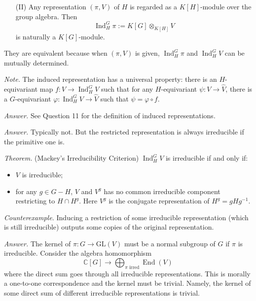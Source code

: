 \documentclass{mathproblems}
\newcommand\C{\mathbb{C}}
\newcommand\GL{\mathrm{GL}}
\DeclareMathOperator{\Ind}{Ind}
\DeclareMathOperator{\End}{End}
\begin{document}
\begin{questions}
\begin{itemize}
\item[(II)] Any representation $(\pi,V)$ of $H$ is regarded as a $K[H]$-module over the group algebra. Then
$$
\Ind_H^G \pi := K[G]\otimes_{K[H]} V
$$
is naturally a $K[G]$-module.
\end{itemize}
They are equivalent because when $(\pi,V)$ is given, $\Ind_H^G \pi$ and $\Ind_H^G V$ can be mutually determined.

\textit{Note.} The induced representation has a universal property: there is an $H$-equivariant map $f:V\to \Ind_H^G V$ such that for any $H$-equivariant $\psi:V\to \hat{V}$, there is a $G$-equivariant $\varphi:\Ind_H^G V\to \hat{V}$ such that $\psi=\varphi\circ f$.


\textit{Answer.} See Question 11 for the definition of induced representations.


\textit{Answer.} Typically not. But the restricted representation is always irreducible if the primitive one is.

{\color{violet}
\textit{Theorem.} (Mackey's Irreducibility Criterion) $\Ind_H^G V$ is irreducible if and only if:
\begin{itemize}
    \item $V$ is irreducible;
    \item for any $g\in G-H$, $V$ and $V^g$ has no common irreducible component restricting to $H\cap H^g$. Here $V^g$ is the conjugate representation of $H^g=g H g^{-1}$.
\end{itemize}
}

\textit{Counterexample.} Inducing a restriction of some irreducible representation (which is still irreducible) outputs some copies of the original representation.


\textit{Answer.} The kernel of $\pi:G\to \GL(V)$ must be a normal subgroup of $G$ if $\pi$ is irreducible. Consider the algebra homomorphism
$$
\C[G]\longrightarrow \bigoplus_{\pi \text{ irred}} \End(V)
$$
where the direct sum goes through all irreducible representations. This is morally a one-to-one correspondence and the kernel must be trivial. Namely, the kernel of some direct sum of different irreducible representations is trivial.


\end{questions}
\end{document}
